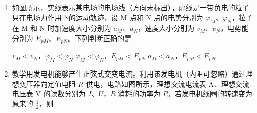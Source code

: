 \documentclass[\gkver]{gaokaozhenti}
\begin{document}
\begin{enumerate}
{

由圆周运动规律可知：重力沿垂直曲面的分力与曲面对运动员的支持力的合力充当向心力，则有 $F_{N} - mg\cos\theta = m\frac{v^{2}}{R}$，即 $F_{N} = m\frac{v^{2}}{R} + mg\cos\theta$，由于运动过程中运动员速率恒定，且 $\theta$ 在减小，所以曲面对运动员的支持力越来越大，由 $f = \mu F_{N}$ 可知摩擦力越来越大，故 B 错误；由于运动员运动过程中速率不变，质量不变，动能不变，则动能变化量为零，由动能定理可得合力做功为零，故 C 正确；因为运动员运动过程中要克服摩擦力做功，所以其机械能不守恒，故 D 错误。
}

\item
如图所示，实线表示某电场的电场线（方向未标出），虚线是一带负电的粒子只在电场力作用下的运动轨迹，设 M 点和 N 点的电势分别为 $\varphi_{M}$、$\varphi_{N}$，粒子在 M 和 N 时加速度大小分别为 $a_{M}$、$a_{N}$，速度大小分别为 $v_{M}$、$v_{N}$，电势能分别为 $E_{pM}$、$E_{pN}$。下列判断正确的是

\onepicture[w=3.80cm]{}

{$v_{M} < v_{N}$，$\varphi_{M} < \varphi_{N}$}
{$\varphi_{M} < \varphi_{N}$，$E_{pM} < E_{pN}$}
{$a_{M} < a_{N}$，$E_{pM} < E_{pN}$}


\item
教学用发电机能够产生正弦式交变电流。利用该发电机（内阻可忽略）通过理想变压器向定值电阻 $R$ 供电，电路如图所示，理想交流电流表 A、理想交流电压表 V 的读数分别为 $I$、$U$，$R$ 消耗的功率为 $P$。若发电机线圈的转速变为原来的 $\frac{1}{2}$，则


\end{enumerate}
\end{document}
